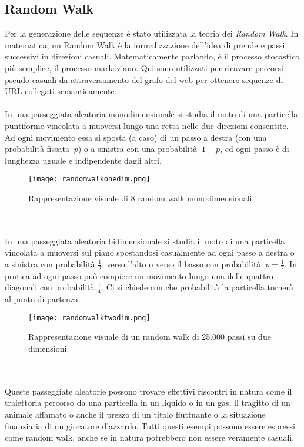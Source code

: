 \subsection{Random Walk}
\label{rwsection}
Per la generazione delle sequenze è stato utilizzata la teoria dei \textit{Random Walk}. In matematica, un Random Walk è la formalizzazione dell'idea di prendere passi successivi in direzioni casuali. Matematicamente parlando, è il processo stocastico più semplice, il processo markoviano. Qui sono utilizzati per ricavare percorsi pseudo casuali da attraversamento del grafo del web per ottenere sequenze di URL collegati semanticamente.
\\\\
In una passeggiata aleatoria monodimensionale si studia il moto di una particella puntiforme vincolata a muoversi lungo una retta nelle due direzioni consentite. Ad ogni movimento essa si sposta (a caso) di un passo a destra (con una probabilità fissata $\ p$) o a sinistra con una probabilità $\ 1-p$, ed ogni passo è di lunghezza uguale e indipendente dagli altri.
\begin{figure}[htb]
	\centering
	\texttt{[image: randomwalkonedim.png]}
	\caption{Rappresentazione visuale di 8 random walk monodimensionali. }
	\label{englishchinese}
\end{figure}
\\\\
In una passeggiata aleatoria bidimensionale si studia il moto di una particella vincolata a muoversi sul piano spostandosi casualmente ad ogni passo a destra o a sinistra con probabilità $\frac{1}{2}$, verso l'alto o verso il basso con probabilità $\ p=\frac{1}{2}$. In pratica ad ogni passo può compiere un movimento lungo una delle quattro diagonali con probabilità $\frac{1}{4}$. Ci si chiede con che probabilità la particella tornerà al punto di partenza.
\begin{figure}[htb]
	\centering
	\texttt{[image: randomwalktwodim.png]}
	\caption{Rappresentazione visuale di un random walk di 25.000 passi su due dimensioni. }
	\label{englishchinese}
\end{figure}
\\\\
Queste passeggiate aleatorie possono trovare effettivi riscontri in natura come il traiettoria percorso da una particella in un liquido o in un gas, il tragitto di un animale affamato o anche il prezzo di un titolo fluttuante o la situazione finanziaria di un giocatore d'azzardo. Tutti questi esempi possono essere espressi come random walk, anche se in natura potrebbero non essere veramente casuali.
